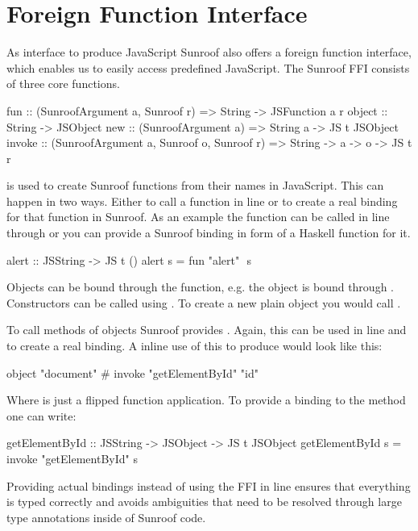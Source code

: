  
\section{Foreign Function Interface}
\label{sec:ffi}

As interface to produce JavaScript Sunroof also offers a 
foreign function interface, which enables us to easily 
access predefined JavaScript. The Sunroof FFI consists of three core functions.
\begin{Code}
fun    :: (SunroofArgument a, Sunroof r) 
       => String -> JSFunction a r
object :: String -> JSObject
new    :: (SunroofArgument a) 
       => String a -> JS t JSObject
invoke :: (SunroofArgument a, Sunroof o, Sunroof r) 
       => String -> a -> o -> JS t r
\end{Code}
 is used to create Sunroof functions from their names in JavaScript.
This can happen in two ways. Either to call a function in line or to 
create a real binding for that function in Sunroof. As an example 
the  function can be called in line through 
or you can provide a Sunroof binding in form of a Haskell function for it.
\begin{Code}
alert :: JSString -> JS t ()
alert s = fun "alert" $$ s
\end{Code}

Objects can be bound through the  function, e.g.
the  object is bound through .
Constructors can be called using . To create a new plain
object you would call .

To call methods of objects Sunroof provides . Again, this 
can be used in line and to create a real binding. A inline 
use of this to produce  would look like this: 
\begin{Code}
object "document" # invoke "getElementById" "id"
\end{Code}
Where \Src{\#} is just a flipped function application. To provide a binding 
to the  method one can write:
\begin{Code}
getElementById :: JSString -> JSObject -> JS t JSObject
getElementById s = invoke "getElementById" s
\end{Code}
Providing actual bindings instead of using the FFI in line ensures that
everything is typed correctly and avoids ambiguities that need 
to be resolved through large type annotations inside
of Sunroof code.

